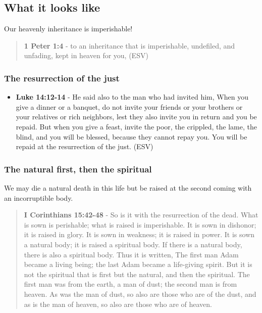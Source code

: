 \documentclass[11pt]{article}
\begin{document}
\subsection{What it looks like}
\label{sec:orgeea9b5a}
Our heavenly inheritance is imperishable!

\begin{quote}
\textbf{1 Peter 1:4} -  to an inheritance that is imperishable, undefiled, and unfading, kept in heaven for you,  (ESV)
\end{quote}

\subsubsection{The resurrection of the just}
\label{sec:orgdfb16f3}
\begin{itemize}
\item \textbf{Luke 14:12-14} - He said also to the man who had invited him, When you give a dinner or a banquet, do not invite your friends or your brothers or your relatives or rich neighbors, lest they also invite you in return and you be repaid. But when you give a feast, invite the poor, the crippled, the lame, the blind, and you will be blessed, because they cannot repay you. You will be repaid at the resurrection of the just. (ESV)
\end{itemize}

\subsubsection{The natural first, then the spiritual}
\label{sec:org3503dd5}
We may die a natural death in this life but be raised at the second coming with an incorruptible body.

\begin{quote}
\textbf{I Corinthians 15:42-48} - So is it with the resurrection of the dead. What is sown is perishable; what is raised is imperishable.  It is sown in dishonor; it is raised in glory. It is sown in weakness; it is raised in power.  It is sown a natural body; it is raised a spiritual body. If there is a natural body, there is also a spiritual body.  Thus it is written, The first man Adam became a living being; the last Adam became a life-giving spirit.  But it is not the spiritual that is first but the natural, and then the spiritual.  The first man was from the earth, a man of dust; the second man is from heaven.  As was the man of dust, so also are those who are of the dust, and as is the man of heaven, so also are those who are of heaven.
\end{quote}
\end{document}
